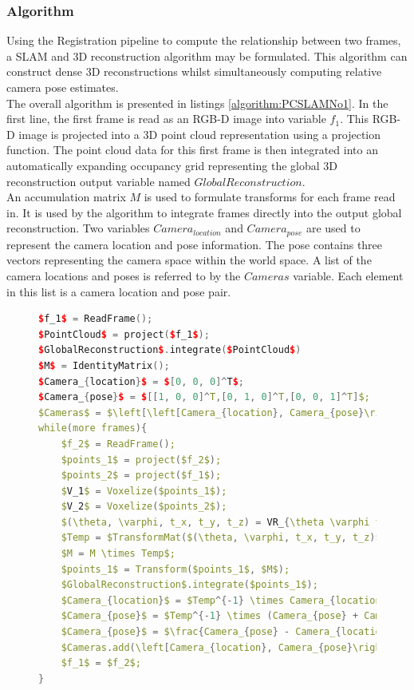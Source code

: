 \subsubsection{Algorithm}

Using the Registration pipeline to compute the relationship between two frames, a SLAM and 3D reconstruction algorithm may be formulated. This algorithm can construct dense 3D reconstructions whilst simultaneously computing relative camera pose estimates. \\

 
The overall algorithm is presented in listings \ref{algorithm:PCSLAMNo1}. In the first line, the first frame is read as an RGB-D image into variable $f_1$. This RGB-D image is projected into a 3D point cloud representation using a projection function. The point cloud data for this first frame is then integrated into an automatically expanding occupancy grid representing the global 3D reconstruction output variable named $GlobalReconstruction$. \\

An accumulation matrix $M$ is used to formulate transforms for each frame read in. It is used by the algorithm to integrate frames directly into the output global reconstruction. Two variables $Camera_{location}$ and $Camera_{pose}$ are used to represent the camera location and pose information. The pose contains three vectors representing the camera space within the world space. A list of the camera locations and poses is referred to by the $Cameras$ variable. Each element in this list is a camera location and pose pair. \\

\begin{figure}
\begin{lstlisting}[language=c++,caption=Phase Correlation Based SLAM Algorithm,label=algorithm:PCSLAMNo1,mathescape,basicstyle=\ttfamily]
$f_1$ = ReadFrame();
$PointCloud$ = project($f_1$);
$GlobalReconstruction$.integrate($PointCloud$)
$M$ = IdentityMatrix();
$Camera_{location}$ = $[0, 0, 0]^T$;
$Camera_{pose}$ = $[[1, 0, 0]^T,[0, 1, 0]^T,[0, 0, 1]^T]$;
$Cameras$ = $\left[\left[Camera_{location}, Camera_{pose}\right] \right]$;
while(more frames){
	$f_2$ = ReadFrame();
	$points_1$ = project($f_2$);
	$points_2$ = project($f_1$);
	$V_1$ = Voxelize($points_1$);
	$V_2$ = Voxelize($points_2$);
	$(\theta, \varphi, t_x, t_y, t_z) = VR_{\theta \varphi t_x t_y t_z}(V_1, V_2)$;
	$Temp = $TransformMat($(\theta, \varphi, t_x, t_y, t_z)$);
	$M = M \times Temp$;
	$points_1$ = Transform($points_1$, $M$);
	$GlobalReconstruction$.integrate($points_1$);
	$Camera_{location}$ = $Temp^{-1} \times Camera_{location}$;
	$Camera_{pose}$ = $Temp^{-1} \times (Camera_{pose} + Camera_{location})$;
	$Camera_{pose}$ = $\frac{Camera_{pose} - Camera_{location}}{Camera_{pose} - Camera_{location}}$;
	$Cameras.add(\left[Camera_{location}, Camera_{pose}\right])$;
	$f_1$ = $f_2$;
}
\end{lstlisting}
\end{figure}

